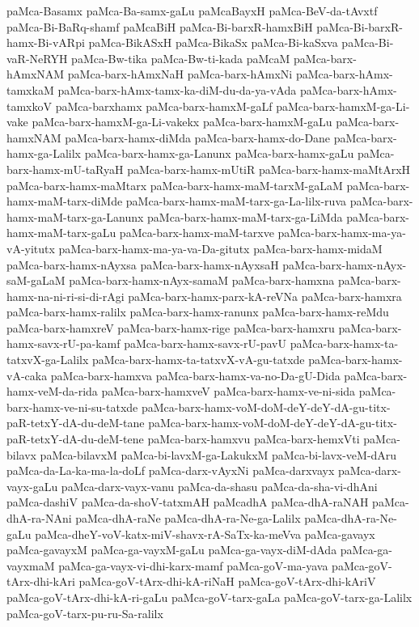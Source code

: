 {paMca-Basamx
paMca-Ba-samx-gaLu
paMcaBayxH
paMca-BeV-da-tAvxtf
paMca-Bi-BaRq-shamf
paMcaBiH
paMca-Bi-barxR-hamxBiH
paMca-Bi-barxR-hamx-Bi-vARpi
paMca-BikASxH
paMca-BikaSx
paMca-Bi-kaSxva
paMca-Bi-vaR-NeRYH
paMca-Bw-tika
paMca-Bw-ti-kada
paMcaM
paMca-barx-hAmxNAM
paMca-barx-hAmxNaH
paMca-barx-hAmxNi
paMca-barx-hAmx-tamxkaM
paMca-barx-hAmx-tamx-ka-diM-du-da-ya-vAda
paMca-barx-hAmx-tamxkoV
paMca-barxhamx
paMca-barx-hamxM-gaLf
paMca-barx-hamxM-ga-Li-vake
paMca-barx-hamxM-ga-Li-vakekx
paMca-barx-hamxM-gaLu
paMca-barx-hamxNAM
paMca-barx-hamx-diMda
paMca-barx-hamx-do-Dane
paMca-barx-hamx-ga-Lalilx
paMca-barx-hamx-ga-Lanunx
paMca-barx-hamx-gaLu
paMca-barx-hamx-mU-taRyaH
paMca-barx-hamx-mUtiR
paMca-barx-hamx-maMtArxH
paMca-barx-hamx-maMtarx
paMca-barx-hamx-maM-tarxM-gaLaM
paMca-barx-hamx-maM-tarx-diMde
paMca-barx-hamx-maM-tarx-ga-La-lilx-ruva
paMca-barx-hamx-maM-tarx-ga-Lanunx
paMca-barx-hamx-maM-tarx-ga-LiMda
paMca-barx-hamx-maM-tarx-gaLu
paMca-barx-hamx-maM-tarxve
paMca-barx-hamx-ma-ya-vA-yitutx
paMca-barx-hamx-ma-ya-va-Da-gitutx
paMca-barx-hamx-midaM
paMca-barx-hamx-nAyxsa
paMca-barx-hamx-nAyxsaH
paMca-barx-hamx-nAyx-saM-gaLaM
paMca-barx-hamx-nAyx-samaM
paMca-barx-hamxna
paMca-barx-hamx-na-ni-ri-si-di-rAgi
paMca-barx-hamx-parx-kA-reVNa
paMca-barx-hamxra
paMca-barx-hamx-ralilx
paMca-barx-hamx-ranunx
paMca-barx-hamx-reMdu
paMca-barx-hamxreV
paMca-barx-hamx-rige
paMca-barx-hamxru
paMca-barx-hamx-savx-rU-pa-kamf
paMca-barx-hamx-savx-rU-pavU
paMca-barx-hamx-ta-tatxvX-ga-Lalilx
paMca-barx-hamx-ta-tatxvX-vA-gu-tatxde
paMca-barx-hamx-vA-caka
paMca-barx-hamxva
paMca-barx-hamx-va-no-Da-gU-Dida
paMca-barx-hamx-veM-da-rida
paMca-barx-hamxveV
paMca-barx-hamx-ve-ni-sida
paMca-barx-hamx-ve-ni-su-tatxde
paMca-barx-hamx-voM-doM-deY-deY-dA-gu-titx-paR-tetxY-dA-du-deM-tane
paMca-barx-hamx-voM-doM-deY-deY-dA-gu-titx-paR-tetxY-dA-du-deM-tene
paMca-barx-hamxvu
paMca-barx-hemxVti
paMca-bilavx
paMca-bilavxM
paMca-bi-lavxM-ga-LakukxM
paMca-bi-lavx-veM-dAru
paMca-da-La-ka-ma-la-doLf
paMca-darx-vAyxNi
paMca-darxvayx
paMca-darx-vayx-gaLu
paMca-darx-vayx-vanu
paMca-da-shasu
paMca-da-sha-vi-dhAni
paMca-dashiV
paMca-da-shoV-tatxmAH
paMcadhA
paMca-dhA-raNAH
paMca-dhA-ra-NAni
paMca-dhA-raNe
paMca-dhA-ra-Ne-ga-Lalilx
paMca-dhA-ra-Ne-gaLu
paMca-dheY-voV-katx-miV-shavx-rA-SaTx-ka-meVva
paMca-gavayx
paMca-gavayxM
paMca-ga-vayxM-gaLu
paMca-ga-vayx-diM-dAda
paMca-ga-vayxmaM
paMca-ga-vayx-vi-dhi-karx-mamf
paMca-goV-ma-yava
paMca-goV-tArx-dhi-kAri
paMca-goV-tArx-dhi-kA-riNaH
paMca-goV-tArx-dhi-kAriV
paMca-goV-tArx-dhi-kA-ri-gaLu
paMca-goV-tarx-gaLa
paMca-goV-tarx-ga-Lalilx
paMca-goV-tarx-pu-ru-Sa-ralilx
}
